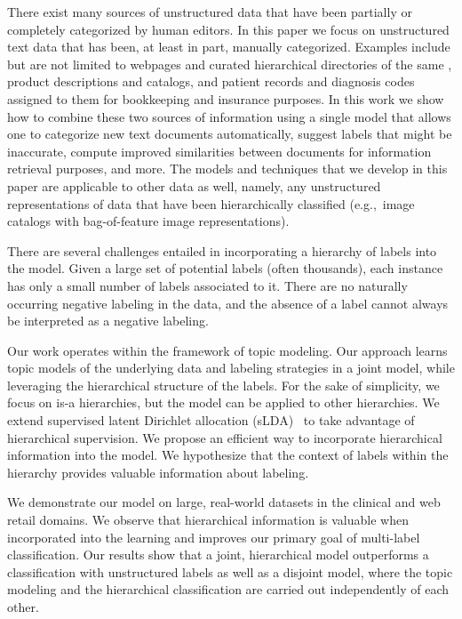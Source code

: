 There exist many sources of unstructured data that have been partially or
completely categorized by human editors.  In this paper we focus on
unstructured text data that has been, at least in part, manually
categorized.  Examples include but are not limited to webpages and curated
hierarchical directories of the same \citep{DMOZ}, product descriptions and
catalogs, %
and patient records %
and diagnosis codes assigned to them for bookkeeping and insurance purposes.
In this work we show how to combine 
these two sources of information using a single model that allows one to
categorize new text documents automatically, suggest labels that might be
inaccurate, compute improved similarities between documents for information
retrieval purposes, and more. The models and techniques that we develop in
this paper are applicable to other data as well, namely, any unstructured
representations of data that have been hierarchically classified (e.g.,~image
catalogs with bag-of-feature image representations).

There are several challenges entailed in incorporating a hierarchy of labels
into the model. Given a large set of potential labels (often thousands), each
instance has only a small number of labels associated to it. There are no
naturally occurring negative labeling in the data, and the absence of a label
cannot always be interpreted as a negative labeling. 

Our work operates within the framework of topic modeling. Our approach learns
topic models of the underlying data and labeling strategies in a joint model,
while leveraging the hierarchical structure of the labels. For the sake of
simplicity, we focus on is-a hierarchies, but the model can be
applied to other hierarchies. We extend supervised latent Dirichlet
allocation (sLDA)~\cite{BleiMcAuliffe2008} to take advantage of hierarchical
supervision. We propose an efficient way to incorporate hierarchical
information into the model. We hypothesize that the context of labels within
the hierarchy provides valuable information about labeling. 

We demonstrate our model on large, real-world datasets in the clinical and web
retail domains. We observe that hierarchical information is valuable when
incorporated into the learning and improves our primary goal of multi-label
classification. Our results show that a joint, hierarchical model outperforms a
classification with unstructured labels as well as a disjoint model, where the
topic modeling and the hierarchical classification are carried out
independently of each other. 

